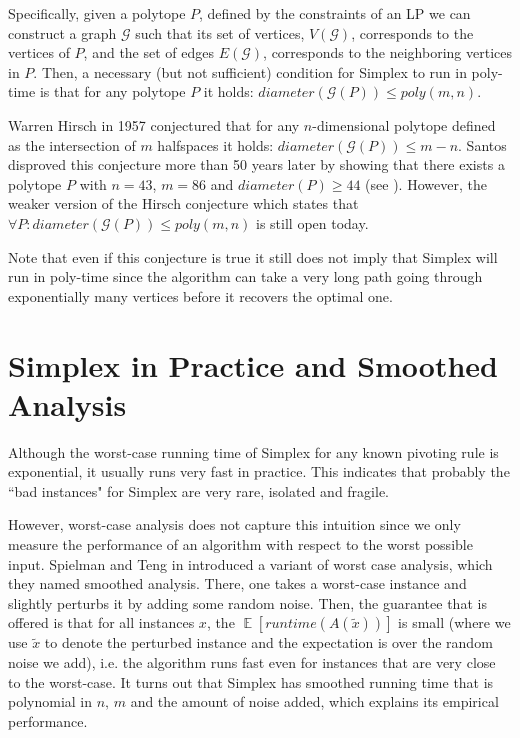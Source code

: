 \documentclass[11pt]{article}
\DeclareMathOperator*{\E}{\mathbb{E}}
\begin{document}
Specifically, given a polytope $P$, defined by the constraints of an LP we can construct a graph $\mathcal{G}$ such that its set of vertices, $V(\mathcal{G})$, corresponds to the vertices of $P$, and the set of edges $E(\mathcal{G})$, corresponds to the neighboring vertices in $P$. Then, a necessary (but not sufficient) condition for Simplex to run in poly-time is that for any polytope $P$ it holds: $diameter(\mathcal{G}(P)) \leq poly(m,n)$.

Warren Hirsch in 1957 conjectured that for any $n$-dimensional polytope defined as the intersection of $m$ halfspaces it holds: $diameter(\mathcal{G}(P)) \leq m - n$. Santos disproved this conjecture more than 50 years later by showing that there exists a polytope $P$ with $n = 43$, $m = 86$ and $diameter(P) \geq 44$ (see \cite{Santos11}). However, the weaker version of the Hirsch conjecture which states that $\forall P: diameter(\mathcal{G}(P)) \leq poly(m,n)$ is still open today.

Note that even if this conjecture is true it still does not imply that Simplex will run in poly-time since the algorithm can take a very long path going through exponentially many vertices before it recovers the optimal one.



\section{Simplex in Practice and Smoothed Analysis}

Although the worst-case running time of Simplex for any known pivoting rule is exponential, it usually runs very fast in practice. This indicates that probably the ``bad instances" for Simplex are very rare, isolated and fragile.

However, worst-case analysis does not capture this intuition since we only measure the performance of an algorithm with respect to the worst possible input. Spielman and Teng in \cite{SpielmanT2014} introduced a variant of worst case analysis, which they named smoothed analysis. There, one takes a worst-case instance and slightly perturbs it by adding some random noise. Then, the guarantee that is offered is that for all instances $x$, the $\E[runtime(A(\widetilde{x}))]$ is small (where we use $\widetilde{x}$ to denote the perturbed instance and the expectation is over the random noise we add), i.e. the algorithm runs fast even for instances that are very close to the worst-case. It turns out that Simplex has smoothed running time that is polynomial in $n,\,m$ and the amount of noise added, which explains its empirical performance.
\end{document}
